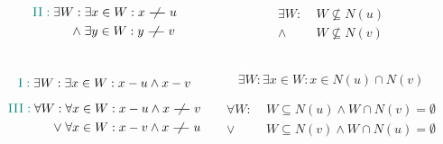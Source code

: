 \begin{frame}
  \begin{columns}[t]
      \begin{description}
	\item[$\teal{\textsc{II}}$]
	  \begin{align*}
	    \teal{\textsc{II}:}\;
	    \exists W:\; &\exists x \in W: x \nadj u \\
		       \land\; &\exists y \in W: y \nadj v
	  \end{align*}
	\item[$\red{\textsc{II}'}$] \textcolor{white}{dummy}
	  \[
	    \textcolor{teal}{\textsc{I}:}\; \exists W: \exists x \in W: x-u \land x-v
	  \]

	  \begin{align*}
	    \teal{\textsc{III}:}\;
	    \forall W:\; &\forall x \in W: x - u \land x \nadj v \\
		       \lor\; &\forall x \in W: x - v \land x \nadj u 
	  \end{align*}
    \end{description}
      \pause
      \begin{description}
	\item[$\teal{\textsc{II}}$]
	  \begin{align*}
	    \exists W:\; &W \nsubseteq N(u) \\
		  \land\; &W \nsubseteq N(v)
	  \end{align*}
	\item[$\red{\textsc{II}'}$] \textcolor{white}{dummy}
	  \pause
	  \[
	    \exists W: \exists x \in W: x \in N(u) \cap N(v)
	  \]

	  \pause
	  \begin{align*}
	    \forall W: \;&W \subseteq N(u) \land W \cap N(v) = \emptyset \\
		  \lor\; &W \subseteq N(v) \land W \cap N(u) = \emptyset
	  \end{align*}
      \end{description}
  \end{columns}
\end{frame}

